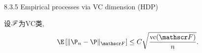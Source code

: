 8.3.5 Empirical processes via VC dimension (HDP)


\begin{theorem}[VC类的一致大数定律]
	设$\mathscr{F}$为VC类, 
	\begin{equation*}
		\E\left[ \|\P_n - \P\|_{\sF} \right] \leq C \sqrt{\frac{\vc(\sF)}{n}}. 
	\end{equation*}
\end{theorem}









